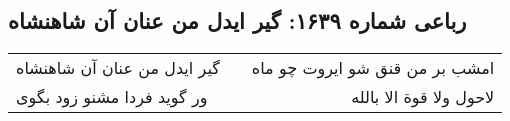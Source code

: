 \begin{center}
\section*{رباعی شماره ۱۶۳۹: گیر ایدل من عنان آن شاهنشاه}
\label{sec:1639}
\begin{longtable}{l p{0.5cm} r}
گیر ایدل من عنان آن شاهنشاه
&&
امشب بر من قنق شو ایروت چو ماه
\\
ور گوید فردا مشنو زود بگوی
&&
لاحول ولا قوة الا بالله
\\
\end{longtable}
\end{center}
